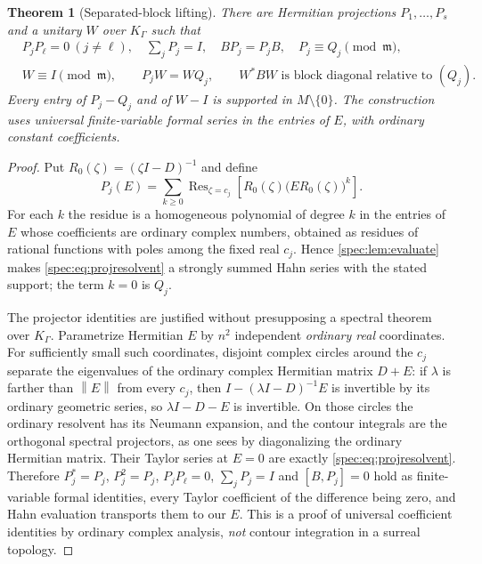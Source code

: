 \documentclass[11pt,a4paper]{article}
\numberwithin{equation}{section}
\newtheorem{theorem}{Theorem}[section]
\theoremstyle{definition}
\theoremstyle{remark}
\newcommand{\mm}{\mathfrak m}
\newcommand{\Res}{\operatorname{Res}}
\newcommand{\norm}[1]{\left\lVert#1\right\rVert}
\begin{document}
\begin{theorem}[Separated-block lifting]\label{spec:thm:split}
There are Hermitian projections $P_1,\ldots,P_s$ and a unitary $W$ over
$K_\Gamma$ such that
\begin{align}
 &P_jP_\ell=0\ (j\ne\ell),\quad \textstyle\sum_jP_j=I,\quad BP_j=P_jB,
   \quad P_j\equiv Q_j\pmod{\mm},\label{spec:eq:projectors}\\
 &W\equiv I\pmod{\mm},\qquad P_jW=WQ_j,\qquad
   W^*BW\text{ is block diagonal relative to }(Q_j).\label{spec:eq:W}
\end{align}
Every entry of $P_j-Q_j$ and of $W-I$ is supported in $M\setminus\{0\}$. The
construction uses universal finite-variable formal series in the entries of
$E$, with ordinary constant coefficients.
\end{theorem}
\begin{proof}
Put $R_0(\zeta)=(\zeta I-D)^{-1}$ and define
\begin{equation}\label{spec:eq:projresolvent}
 P_j(E)=\sum_{k\ge0}\Res_{\zeta=c_j}
    \left[R_0(\zeta)\bigl(ER_0(\zeta)\bigr)^k\right].
\end{equation}
For each $k$ the residue is a homogeneous polynomial of degree $k$ in the
entries of $E$ whose coefficients are ordinary complex numbers, obtained as
residues of rational functions with poles among the fixed real $c_j$. Hence
\cref{spec:lem:evaluate} makes \eqref{spec:eq:projresolvent} a strongly
summed Hahn series with the stated support; the term $k=0$ is $Q_j$.

The projector identities are justified without presupposing a spectral
theorem over $K_\Gamma$. Parametrize Hermitian $E$ by $n^2$ independent
\emph{ordinary real} coordinates. For sufficiently small such coordinates,
disjoint complex circles around the $c_j$ separate the eigenvalues of the
ordinary complex Hermitian matrix $D+E$: if $\lambda$ is farther than
$\norm E$ from every $c_j$, then $I-(\lambda I-D)^{-1}E$ is invertible by
its ordinary geometric series, so $\lambda I-D-E$ is invertible. On those
circles the ordinary resolvent has its Neumann expansion, and the contour
integrals are the orthogonal spectral projectors, as one sees by
diagonalizing the ordinary Hermitian matrix. Their Taylor series at $E=0$
are exactly \eqref{spec:eq:projresolvent}. Therefore $P_j^*=P_j$,
$P_j^2=P_j$, $P_jP_\ell=0$, $\sum_jP_j=I$ and $[B,P_j]=0$ hold as
finite-variable formal identities, every Taylor coefficient of the
difference being zero, and Hahn evaluation transports them to our $E$. This
is a proof of universal coefficient identities by ordinary complex analysis,
\emph{not} contour integration in a surreal topology.


\end{proof}
\end{document}
